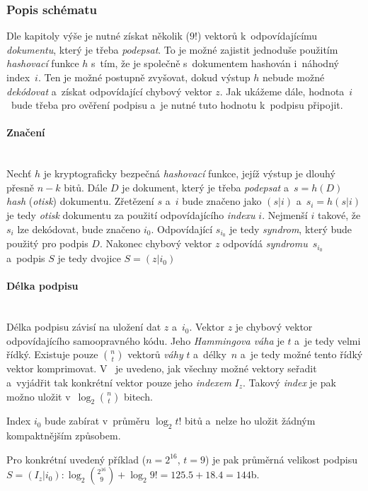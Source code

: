 \documentclass[thesis=M,czech,hidelinks]{FITthesis}[2012/06/26]
\newcommand{\0}{{\textcolor[gray]{0.75}{0}}}
\begin{document}
\subsubsection{Popis schématu}

Dle kapitoly výše je nutné získat několik ($9!$) vektorů k~odpovídajícímu
\emph{dokumentu}, který je třeba \emph{podepsat}. To je možné zajistit jednoduše
použitím \emph{hashovací} funkce $h$ s~tím, že je společně s~dokumentem hashován
i~náhodný index~$i$. Ten je možné postupně zvyšovat, dokud výstup $h$ nebude
možné \emph{dekódovat} a~získat odpovídající chybový vektor $z$. Jak ukážeme
dále, hodnota~$i$~bude třeba pro ověření podpisu a~je nutné tuto hodnotu
k~podpisu připojit.

\paragraph{Značení} \hfil \\
Nechť $h$ je kryptograficky bezpečná \emph{hashovací} funkce, jejíž výstup je
dlouhý přesně $n-k$ bitů. Dále $D$ je dokument, který je třeba \emph{podepsat}
a~$ s = h\left(D\right)$ \emph{hash} (\emph{otisk}) dokumentu. Zřetězení $s$ a~$i$
bude značeno jako $(s|i)$ a~$s_i = h(s|i)$ je tedy \emph{otisk} dokumentu za
použití odpovídajícího \emph{indexu} $i$. Nejmenší $i$ takové, že $s_i$ lze
dekódovat, bude značeno $i_0$. Odpovídající $s_{i_0}$ je tedy \emph{syndrom},
který bude použitý pro podpis $D$. Nakonec chybový vektor $z$ odpovídá
\emph{syndromu}~$s_{i_0}$ a~podpis $S$ je tedy dvojice $S = ( z | i_0 )$

\paragraph{Délka podpisu} \hfil \\
Délka podpisu závisí na uložení dat $z$ a~$i_0$. Vektor $z$ je chybový vektor
odpovídajícího samoopravného kódu. Jeho \emph{Hammingova váha} je $t$ a~je tedy
velmi řídký. Existuje pouze $\binom{n}{t}$ vektorů \emph{váhy} $t$ a~délky~$n$
a~je tedy možné tento řídký vektor komprimovat. V~\cite{Courtois} je uvedeno,
jak všechny možné vektory seřadit a~vyjádřit tak konkrétní vektor pouze jeho
\emph{indexem} $I_z$. Takový \emph{index} je pak možno uložit
v~$\log_2{\binom{n}{t}}$ bitech.

Index $i_0$ bude zabírat v~průměru $\log_2{t!}$ bitů a~nelze ho uložit žádným
kompaktnějším způsobem.

Pro konkrétní uvedený příklad ($n=2^{16}$, $t=9$) je pak průměrná velikost
podpisu $S = ( I_z | i_0 ): \log_2{\binom{2^{16}}{9}} + \log_2{9!} =
125.5 + 18.4 = 144$\;b.
\end{document}
